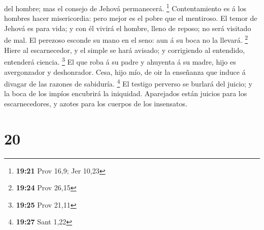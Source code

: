 del hombre; mas el consejo de Jehová permanecerá. \footnote{\textbf{19:21}
  Prov 16,9; Jer 10,23}  Contentamiento es á los hombres
hacer misericordia: pero mejor es el pobre que el mentiroso.
 El temor de Jehová es para vida; y con él vivirá el
hombre, lleno de reposo; no será visitado de mal.  El
perezoso esconde su mano en el seno: aun á su boca no la llevará.
\footnote{\textbf{19:24} Prov 26,15}  Hiere al
escarnecedor, y el simple se hará avisado; y corrigiendo al entendido,
entenderá ciencia. \footnote{\textbf{19:25} Prov 21,11}  El
que roba á su padre y ahuyenta á su madre, hijo es avergonzador y
deshonrador.  Cesa, hijo mío, de oir la enseñanza que
induce á divagar de las razones de sabiduría. \footnote{\textbf{19:27}
  Sant 1,22}  El testigo perverso se burlará del juicio; y
la boca de los impíos encubrirá la iniquidad.  Aparejados
están juicios para los escarnecedores, y azotes para los cuerpos de los
insensatos.

\hypertarget{section-19}{%
\section{20}\label{section-19}}

